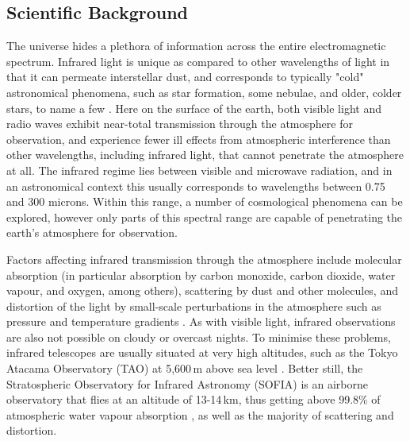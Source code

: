 \subsection{Scientific Background}

The universe hides a plethora of information across the entire electromagnetic spectrum. Infrared light is unique as compared to other wavelengths of light in that it can permeate interstellar dust, and corresponds to typically "cold" astronomical phenomena, such as star formation, some nebulae, and older, colder stars, to name a few \cite{Targets}. Here on the surface of the earth, both visible light and radio waves exhibit near-total transmission through the atmosphere for observation, and experience fewer ill effects from atmospheric interference than other wavelengths, including infrared light, that cannot penetrate the atmosphere at all. The infrared regime lies between visible and microwave radiation, and in an astronomical context this usually corresponds to wavelengths between 0.75 and 300 microns. Within this range, a number of cosmological phenomena can be explored, however only parts of this spectral range are capable of penetrating the earth's atmosphere for observation.

Factors affecting infrared transmission through the atmosphere include molecular absorption (in particular absorption by carbon monoxide, carbon dioxide, water vapour, and oxygen, among others), scattering by dust and other molecules, and distortion of the light by small-scale perturbations in the atmosphere such as pressure and temperature gradients \cite{AstroToday}. As with visible light, infrared observations are also not possible on cloudy or overcast nights. To minimise these problems, infrared telescopes are usually situated at very high altitudes, such as the Tokyo Atacama Observatory (TAO) at 5,600\,m above sea level \cite{TAO}. Better still, the Stratospheric Observatory for Infrared Astronomy (SOFIA) is an airborne observatory that flies at an altitude of 13-14\,km, thus getting above 99.8\% of atmospheric water vapour absorption \cite{SOFIA}, as well as the majority of scattering and distortion. 
